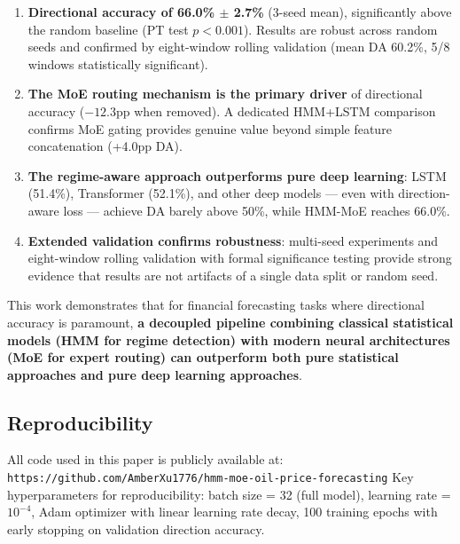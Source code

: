 \documentclass[3p,times]{elsarticle}
\begin{document}
\begin{enumerate}
\item \textbf{Directional accuracy of 66.0\% $\pm$ 2.7\%} (3-seed mean), significantly above the random baseline (PT test $p < 0.001$). Results are robust across random seeds and confirmed by eight-window rolling validation (mean DA 60.2\%, 5/8 windows statistically significant).

\item \textbf{The MoE routing mechanism is the primary driver} of directional accuracy ($-12.3$pp when removed). A dedicated HMM+LSTM comparison confirms MoE gating provides genuine value beyond simple feature concatenation (+4.0pp DA).

\item \textbf{The regime-aware approach outperforms pure deep learning}: LSTM (51.4\%), Transformer (52.1\%), and other deep models --- even with direction-aware loss --- achieve DA barely above 50\%, while HMM-MoE reaches 66.0\%.

\item \textbf{Extended validation confirms robustness}: multi-seed experiments and eight-window rolling validation with formal significance testing provide strong evidence that results are not artifacts of a single data split or random seed.
\end{enumerate}

This work demonstrates that for financial forecasting tasks where directional accuracy is paramount, \textbf{a decoupled pipeline combining classical statistical models (HMM for regime detection) with modern neural architectures (MoE for expert routing) can outperform both pure statistical approaches and pure deep learning approaches}.

\subsection*{Reproducibility}

All code used in this paper is publicly available at: \texttt{https://github.com/AmberXu1776/hmm-moe-oil-price-forecasting}  
Key hyperparameters for reproducibility: batch size = 32 (full model), learning rate = $10^{-4}$, Adam optimizer with linear learning rate decay, 100 training epochs with early stopping on validation direction accuracy.

\end{document}
